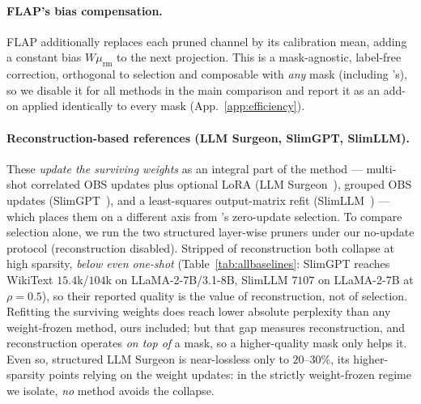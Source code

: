 \paragraph{FLAP's bias compensation.}
FLAP additionally replaces each pruned channel by its calibration mean, adding a constant bias $W\mu_{\text{rm}}$ to the next projection.
This is a mask-agnostic, label-free correction, orthogonal to selection and composable with \emph{any} mask (including \method's), so we disable it for all methods in the main comparison and report it as an add-on applied identically to every mask (App.~\ref{app:efficiency}).

\paragraph{Reconstruction-based references (LLM Surgeon, SlimGPT, SlimLLM).}
These \emph{update the surviving weights} as an integral part of the method --- multi-shot correlated OBS updates plus optional LoRA (LLM Surgeon~\citep{ouderaa2024llmsurgeon}), grouped OBS updates (SlimGPT~\citep{ling2024slimgpt}), and a least-squares output-matrix refit (SlimLLM~\citep{guo2025slimllm}) --- which places them on a different axis from \method's zero-update selection.
To compare selection alone, we run the two structured layer-wise pruners under our no-update protocol (reconstruction disabled).
Stripped of reconstruction both collapse at high sparsity, \emph{below even one-shot} (Table~\ref{tab:allbaselines}: SlimGPT reaches WikiText $15.4$k/$104$k on LLaMA-2-7B/3.1-8B, SlimLLM $7107$ on LLaMA-2-7B at $\rho{=}0.5$), so their reported quality is the value of reconstruction, not of selection.
Refitting the surviving weights does reach lower absolute perplexity than any weight-frozen method, ours included; but that gap measures reconstruction, and reconstruction operates \emph{on top of} a mask, so a higher-quality mask only helps it.
Even so, structured LLM Surgeon is near-lossless only to $20$--$30\%$, its higher-sparsity points relying on the weight updates: in the strictly weight-frozen regime we isolate, \emph{no} method avoids the collapse.

